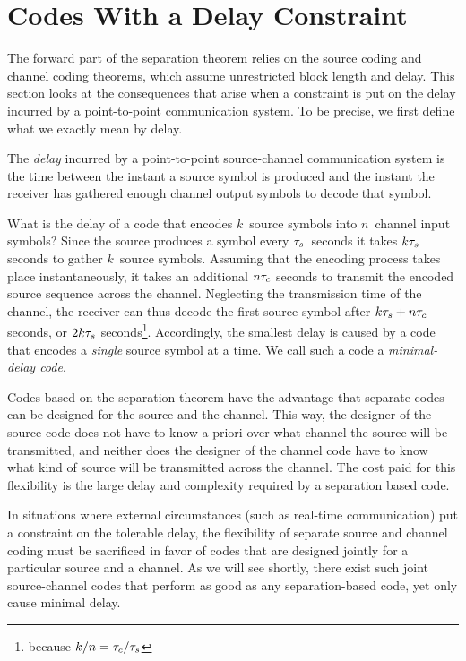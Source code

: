 \section{Codes With a Delay Constraint}\label{sec:delayconstraint}

The forward part of the separation theorem relies on the source coding and
channel coding theorems, which assume unrestricted block length and
delay. This section looks at the consequences that arise when a
constraint is put on the delay incurred by a point-to-point communication
system. To be precise, we first define what we exactly mean by delay.

\begin{definition}
  \label{def:delay}
  The \emph{delay} incurred by a point-to-point source-channel communication
  system is the time between the instant a source symbol is produced and the
  instant the receiver has gathered enough channel output symbols to decode that
  symbol. 
\end{definition}

What is the delay of a code that encodes $k$~source symbols into $n$~channel
input symbols? Since the source produces a symbol every ${\tau_s}$~seconds it takes
$k{\tau_s}$ seconds to gather $k$~source symbols. Assuming that the encoding process
takes place instantaneously, it takes an additional $n{\tau_c}$ seconds to transmit
the encoded source sequence across the channel. Neglecting the transmission time
of the channel, the receiver can thus decode the first source symbol after $k{\tau_s}
+ n {\tau_c}$ seconds, or $2k{\tau_s}$ seconds\footnote{because $k/n = {\tau_c}/{\tau_s}$}.
Accordingly, the smallest delay is caused by a code that encodes a \emph{single}
source symbol at a time. We call such a code a \emph{minimal-delay code}.

Codes based on the separation theorem have the advantage that separate codes can
be designed for the source and the channel. This way, the designer of the source
code does not have to know a priori over what channel the source will be
transmitted, and neither does the designer of the channel code have to know what
kind of source will be transmitted across the channel. The cost paid for this
flexibility is the large delay and complexity required by a separation based
code. 

In situations where external circumstances (such as real-time communication) put
a constraint on the tolerable delay, the flexibility of separate source and
channel coding must be sacrificed in favor of codes that are designed jointly
for a particular source and a channel. As we will see shortly, there exist such
joint source-channel codes that perform as good as any separation-based code,
yet only cause minimal delay.


